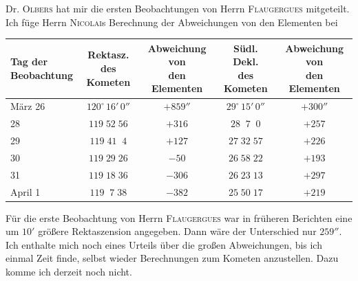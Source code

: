 \par\indent Dr. \textsc{Olbers} hat mir die ersten Beobachtungen von Herrn \textsc{Flaugergues} mitgeteilt. Ich füge Herrn \textsc{Nicolai}s Berechnung der Abweichungen von den Elementen bei

\begin{center}\fontsize{9}{11}\selectfont\setlength{\tabcolsep}{3pt}\renewcommand{\arraystretch}{1.15}\begin{tabular}{l|c|c|c|c}
\shortstack{Tag der\\Beobachtung} & \shortstack{Rektasz.\\des Kometen} & \shortstack{Abweichung von\\den Elementen} & \shortstack{Südl. Dekl.\\des Kometen} & \shortstack{Abweichung von\\den Elementen}\\\hline
März 26 & $120^\circ\,16'\,0''$ & $+859''$ & $29^\circ\,15'\,0''$ & $+300''$\\
28 & $119\;52\;56$ & $+316$ & $28\;\;7\;\;0$ & $+257$\\
29 & $119\;41\;\;4$ & $+127$ & $27\;32\;57$ & $+226$\\
30 & $119\;29\;26$ & $-50$ & $26\;58\;22$ & $+193$\\
31 & $119\;18\;36$ & $-306$ & $26\;23\;13$ & $+297$\\
April 1 & $119\;\;7\;38$ & $-382$ & $25\;50\;17$ & $+219$\\
\end{tabular}\end{center}

\par\indent Für die erste Beobachtung von Herrn \textsc{Flaugergues} war in früheren Berichten eine um $10'$ größere Rektaszension angegeben. Dann wäre der Unterschied nur $259''$. Ich enthalte mich noch eines Urteils über die großen Abweichungen, bis ich einmal Zeit finde, selbst wieder Berechnungen zum Kometen anzustellen. Dazu komme ich derzeit noch nicht.


